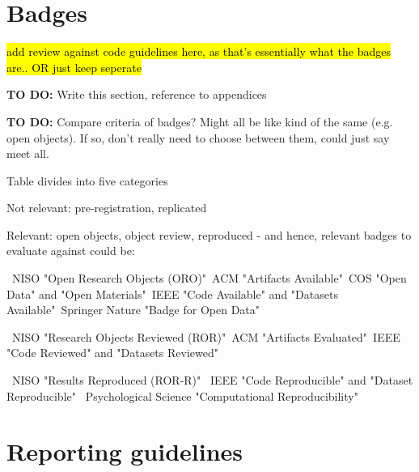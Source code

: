 \section{Badges}

\hl{add review against code guidelines here, as that's essentially what the badges are.. OR just keep seperate}


\textbf{TO DO:} Write this section, reference to appendices

\textbf{TO DO:} Compare criteria of badges? Might all be like kind of the same (e.g. open objects). If so, don't really need to choose between them, could just say meet all.

Table divides into five categories

Not relevant: pre-registration, replicated

Relevant: open objects, object review, reproduced - and hence, relevant badges to evaluate against could be:

\textbullet\ NISO "Open Research Objects (ORO)"\newline \textbullet\ ACM "Artifacts Available"\newline \textbullet\ COS "Open Data" and "Open Materials"\newline \textbullet\ IEEE "Code Available" and "Datasets Available"\newline \textbullet\ Springer Nature "Badge for Open Data"

\textbullet\ NISO "Research Objects Reviewed (ROR)"\newline \textbullet\ ACM "Artifacts Evaluated"\newline \textbullet\ IEEE "Code Reviewed" and "Datasets Reviewed"

\textbullet\ NISO "Results Reproduced (ROR-R)" \newline \textbullet\ IEEE "Code Reproducible" and "Dataset Reproducible" \newline \textbullet\ Psychological Science "Computational Reproducibility"
            
\section{Reporting guidelines}

